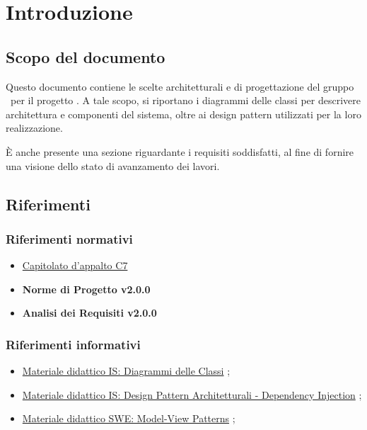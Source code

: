 \section{Introduzione}

\subsection{Scopo del documento}
Questo documento contiene le scelte architetturali e di progettazione del gruppo \groupName\ per il progetto \capName. A tale scopo, si riportano i diagrammi delle classi per descrivere architettura e componenti del sistema, oltre ai design pattern utilizzati per la loro realizzazione.

È anche presente una sezione riguardante i requisiti soddisfatti, al fine di fornire una visione dello stato di avanzamento dei lavori.

\subsection{Riferimenti}

\subsubsection{Riferimenti normativi}
\begin{itemize}
    \item \href{https://www.math.unipd.it/~tullio/IS-1/2022/Progetto/C7.pdf}{Capitolato d'appalto C7} \hfill{}
    \item \textbf{Norme di Progetto v2.0.0}
    \item \textbf{Analisi dei Requisiti v2.0.0}
\end{itemize}

\subsubsection{Riferimenti informativi}
\begin{itemize}
    \item \href{https://www.math.unipd.it/~rcardin/swea/2023/Diagrammi delle Classi.pdf}{Materiale didattico IS: Diagrammi delle Classi} \hfill{};
    \item \href{https://www.math.unipd.it/~rcardin/swea/2022/Design Pattern Architetturali - Dependency Injection.pdf}{Materiale didattico IS: Design Pattern Architetturali - Dependency Injection} \hfill{};
    \item \href{https://www.math.unipd.it/~rcardin/sweb/2022/L02.pdf}{Materiale didattico SWE: Model-View Patterns} \hfill{};
\end{itemize}

\pagebreak

